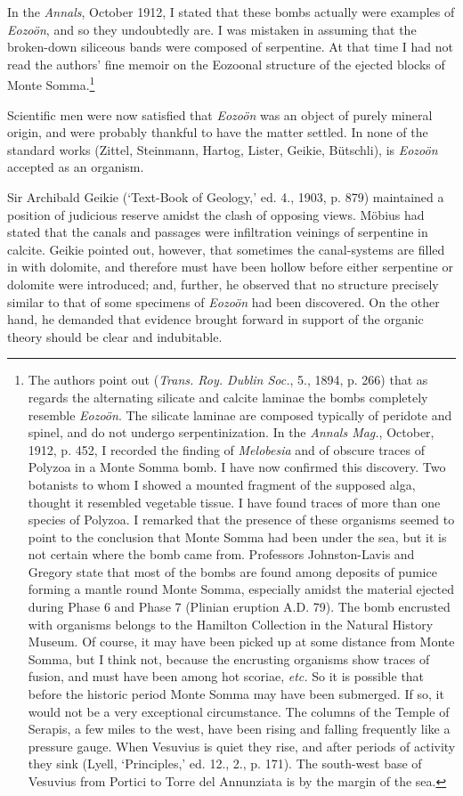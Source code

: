 \documentclass[a4paper, 12pt, oneside]{article}
\begin{document}
In the \emph{Annals}, October 1912, I stated that these bombs actually were examples of \emph{Eozoön}, and so they undoubtedly are. I was mistaken in assuming that the broken-down siliceous bands were composed of serpentine. At that time I had not read the authors' fine memoir on the Eozoonal structure of the ejected blocks of Monte Somma.\footnote{The authors point out (\emph{Trans. Roy. Dublin Soc.}, 5., 1894, p. 266) that as regards the alternating silicate and calcite laminae the bombs completely resemble \emph{Eozoön}. The silicate laminae are composed typically of peridote and spinel, and do not undergo serpentinization. In the \emph{Annals Mag.}, October, 1912, p. 452, I recorded the finding of \emph{Melobesia} and of obscure traces of Polyzoa in a Monte Somma bomb. I have now confirmed this discovery. Two botanists to whom I showed a mounted fragment of the supposed alga, thought it resembled vegetable tissue. I have found traces of more than one species of Polyzoa. I remarked that the presence of these organisms seemed to point to the conclusion that Monte Somma had been under the sea, but it is not certain where the bomb came from. Professors Johnston-Lavis and Gregory state that most of the bombs are found among deposits of pumice forming a mantle round Monte Somma, especially amidst the material ejected during Phase 6 and Phase 7 (Plinian eruption A.D. 79). The bomb encrusted with organisms belongs to the Hamilton Collection in the Natural History Museum. Of course, it may have been picked up at some distance from Monte Somma, but I think not, because the encrusting organisms show traces of fusion, and must have been among hot scoriae, \emph{etc.} So it is possible that before the historic period Monte Somma may have been submerged. If so, it would not be a very exceptional circumstance. The columns of the Temple of Serapis, a few miles to the west, have been rising and falling frequently like a pressure gauge. When Vesuvius is quiet they rise, and after periods of activity they sink (Lyell, `Principles,' ed. 12., 2., p. 171). The south-west base of Vesuvius from Portici to Torre del Annunziata is by the margin of the sea.}

Scientific men were now satisfied that \emph{Eozoön} was an object of purely mineral origin, and were probably thankful to have the matter settled. In none of the standard works (Zittel, Steinmann, Hartog, Lister, Geikie, Bütschli), is \emph{Eozoön} accepted as an organism.

Sir Archibald Geikie (`Text-Book of Geology,' ed. 4., 1903, p. 879) maintained a position of judicious reserve amidst the clash of opposing views. Möbius had stated that the canals and passages were infiltration veinings of serpentine in calcite. Geikie pointed out, however, that sometimes the canal-systems are filled in with dolomite, and therefore must have been hollow before either serpentine or dolomite were introduced; and, further, he observed that no structure precisely similar to that of some specimens of \emph{Eozoön} had been discovered. On the other hand, he demanded that evidence brought forward in support of the organic theory should be clear and indubitable.
\end{document}

